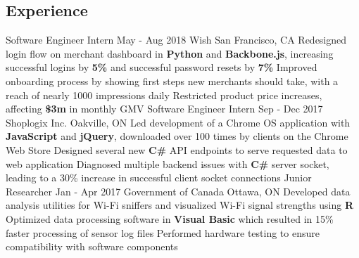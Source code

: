 \documentclass[]{aanguyen_res}
\begin{document}
	\begin{main}%
		\vspace{35pt}%
		\section{Experience}
			\mainentry%
				{Software Engineer Intern}%
				{May - Aug 2018}%
				{Wish}%
				{San Francisco, CA}%
				{\faCaretRight Redesigned login flow on merchant dashboard in \textbf{Python} and \textbf{Backbone.js}, increasing successful logins by \textbf{5\%} and successful password resets by \textbf{7\%}
				\faCaretRight Improved onboarding process by showing first steps new merchants should take, with a reach of nearly 1000 impressions daily
				\faCaretRight Restricted product price increases, affecting \textbf{\$3m} in monthly GMV}
			\vspace{0.1cm}%
			\mainentry%
				{Software Engineer Intern}%
				{Sep - Dec 2017}%
				{Shoplogix Inc.}%
				{Oakville, ON}%
				{\faCaretRight Led development of a Chrome OS application with \textbf{JavaScript} and \textbf{jQuery}, downloaded over 100 times by clients on the Chrome Web Store
				\faCaretRight Designed several new \textbf{C\#} API endpoints to serve requested data to web application
				\faCaretRight Diagnosed multiple backend issues with \textbf{C\#} server socket, leading to a 30\% increase in successful client socket connections}
			\vspace{0.1cm}%
			\mainentry%
				{Junior Researcher}%
				{Jan - Apr 2017}%
				{Government of Canada}%
				{Ottawa, ON}%
				{\faCaretRight Developed data analysis utilities for Wi-Fi sniffers and visualized Wi-Fi signal strengths using \textbf{R}
				  \faCaretRight Optimized data processing software in \textbf{Visual Basic} which resulted in 15\% faster processing of sensor log files
				  \faCaretRight Performed hardware testing to ensure compatibility with software components}
			\vspace{0.30cm}%

\end{main}
\end{document}
